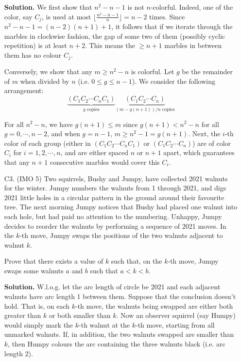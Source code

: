 \documentclass[11pt,a4paper]{article}
\begin{document}
\begin{enumerate}
		\textbf{Solution.} 
		We first show that $n^2-n-1$ is not $n$-colorful. 
		Indeed, one of the color, say $C_j$, is used at most $\lfloor \frac{n^2-n-1}{n}\rfloor = n-2$ times. 
		Since $n^2-n-1=(n-2)(n+1)+1$, it follows that if we iterate through the marbles in clockwise fashion, the gap of some two of them (possibly cyclic repetition) is at least $n+2$. 
		This means the $\ge n+1$ marbles in between them has no colour $C_j$. 
		
		Conversely, we show that any $m\ge n^2-n$ is colorful. 
		Let $g$ be the remainder of $m$ when divided by $n$ (i.e. $0\le g\le n - 1$). 
		We consider the following arrangement: 
		\[
		\underbrace{(C_1C_2\cdots C_nC_1)}_{g \text{ copies}}
		\underbrace{(C_1C_2\cdots C_n)}_{(m - g(n + 1))/n\text{ copies}}
		\]
		
		For all $n^2-n$, we have $g(n+1)\le m$ since $g(n+1) < n^2-n$ for all $g=0, \cdots, n-2$, 
		and when $g=n-1$, $m\ge n^2-1=g(n+1)$. 
		Next, the $i$-th color of each group (either in $(C_1C_2\cdots C_nC_1)$ or $(C_1C_2\cdots C_n)$) are of color $C_i$ for $i=1, 2, \cdots, n$, 
		and are either spaced $n$ or $n+1$ apart, 
		which guarantees that any $n+1$ consecutive marbles would cover this $C_i$. 
		
		\item [C3.] (IMO 5)
		Two squirrels, Bushy and Jumpy, have collected 2021 walnuts for the winter. 
		Jumpy numbers the walnuts from 1 through 2021, 
		and digs 2021 little holes in a circular pattern in the ground around their favourite tree. 
		The next morning Jumpy notices that Bushy had placed one walnut into each hole, but had paid no attention to the numbering. 
		Unhappy, Jumpy decides to reorder the walnuts by performing a sequence of 2021 moves. 
		In the $k$-th move, Jumpy swaps the positions of the two walnuts adjacent to walnut $k$.
		
		Prove that there exists a value of $k$ such that, on the $k$-th move, Jumpy swaps some walnuts $a$ and $b$ such that $a<k<b$.
		
		\textbf{Solution.} 
		W.l.o.g. let the arc length of circle be 2021 and each adjacent walnuts have arc length 1 between them. 
		Suppose that the conclusion doesn't hold. 
		That is, on each $k$-th move, the walnuts being swapped are either both greater than $k$ or both smaller than $k$. 
		Now an observer squirrel (say Humpy) would simply mark the $k$-th walnut at the $k$-th move, starting from all unmarked walnuts. 
		If, in addition, the two walnuts swapped are smaller than $k$, then Humpy colours the arc containing the three walnuts black (i.e. arc length 2). 
		

\end{enumerate}
\end{document}
